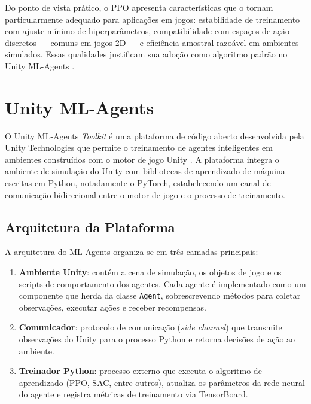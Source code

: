 Do ponto de vista prático, o PPO apresenta características que o tornam
particularmente adequado para aplicações em jogos: estabilidade de treinamento
com ajuste mínimo de hiperparâmetros, compatibilidade com espaços de ação
discretos --- comuns em jogos 2D --- e eficiência amostral razoável em
ambientes simulados. Essas qualidades justificam sua adoção como algoritmo
padrão no Unity ML-Agents \cite{juliani2020unity}.

\section{Unity ML-Agents}
\label{sec:ml-agents}

O Unity ML-Agents \textit{Toolkit} é uma plataforma de código aberto
desenvolvida pela Unity Technologies que permite o treinamento de agentes
inteligentes em ambientes construídos com o motor de jogo Unity
\cite{juliani2020unity}. A plataforma integra o ambiente de simulação do Unity
com bibliotecas de aprendizado de máquina escritas em Python, notadamente o
PyTorch, estabelecendo um canal de comunicação bidirecional entre o motor de
jogo e o processo de treinamento.

\subsection{Arquitetura da Plataforma}
\label{subsec:ml-agents-arquitetura}

A arquitetura do ML-Agents organiza-se em três camadas principais:

\begin{enumerate}
    \item \textbf{Ambiente Unity}: contém a cena de simulação, os objetos de
          jogo e os scripts de comportamento dos agentes. Cada agente é
          implementado como um componente que herda da classe \texttt{Agent},
          sobrescrevendo métodos para coletar observações, executar ações e
          receber recompensas.

    \item \textbf{Comunicador}: protocolo de comunicação (\textit{side
          channel}) que transmite observações do Unity para o processo Python e
          retorna decisões de ação ao ambiente.

    \item \textbf{Treinador Python}: processo externo que executa o algoritmo
          de aprendizado (PPO, SAC, entre outros), atualiza os parâmetros da
          rede neural do agente e registra métricas de treinamento via
          TensorBoard.
\end{enumerate}


